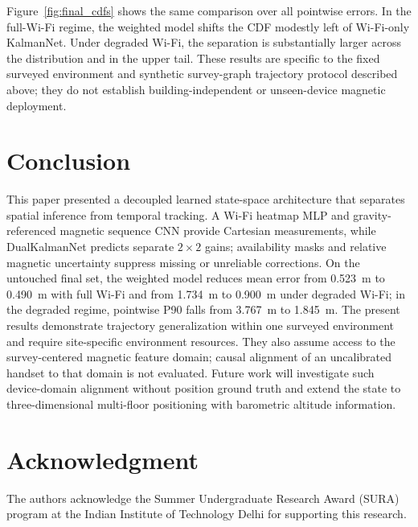 \documentclass[conference]{IEEEtran}
\begin{document}
Figure~\ref{fig:final_cdfs} shows the same comparison over all pointwise errors. In the full-Wi-Fi regime, the weighted model shifts the CDF modestly left of Wi-Fi-only KalmanNet. Under degraded Wi-Fi, the separation is substantially larger across the distribution and in the upper tail. These results are specific to the fixed surveyed environment and synthetic survey-graph trajectory protocol described above; they do not establish building-independent or unseen-device magnetic deployment.

\section{Conclusion}\label{sec:conclusion}

This paper presented a decoupled learned state-space architecture that separates spatial inference from temporal tracking. A Wi-Fi heatmap MLP and gravity-referenced magnetic sequence CNN provide Cartesian measurements, while DualKalmanNet predicts separate $2\!\times\!2$ gains; availability masks and relative magnetic uncertainty suppress missing or unreliable corrections. On the untouched final set, the weighted model reduces mean error from 0.523~m to 0.490~m with full Wi-Fi and from 1.734~m to 0.900~m under degraded Wi-Fi; in the degraded regime, pointwise P90 falls from 3.767~m to 1.845~m. The present results demonstrate trajectory generalization within one surveyed environment and require site-specific environment resources. They also assume access to the survey-centered magnetic feature domain; causal alignment of an uncalibrated handset to that domain is not evaluated. Future work will investigate such device-domain alignment without position ground truth and extend the state to three-dimensional multi-floor positioning with barometric altitude information.

\section*{Acknowledgment}
The authors acknowledge the Summer Undergraduate Research Award (SURA) program at the Indian Institute of Technology Delhi for supporting this research.



\end{document}
